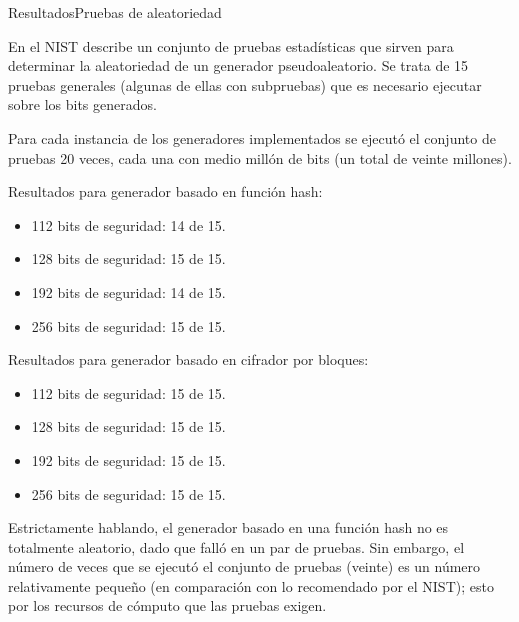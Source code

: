 \begin{frame}{Resultados}{Pruebas de aleatoriedad}

  En \cite{nist_pruebas} el NIST describe un conjunto de pruebas estadísticas
  que sirven para determinar la aleatoriedad de un generador pseudoaleatorio.
  Se trata de 15 pruebas generales (algunas de ellas con subpruebas) que es
  necesario ejecutar sobre los bits generados.

  Para cada instancia de los generadores implementados se ejecutó el conjunto
  de pruebas 20 veces, cada una con medio millón de bits (un total de veinte
  millones).

  {
    Resultados para generador basado en función hash:
    \begin{itemize}
      \item 112 bits de seguridad: 14 de 15.
      \item 128 bits de seguridad: 15 de 15.
      \item 192 bits de seguridad: 14 de 15.
      \item 256 bits de seguridad: 15 de 15.
    \end{itemize}
  }

  {
    Resultados para generador basado en cifrador por bloques:
    \begin{itemize}
      \item 112 bits de seguridad: 15 de 15.
      \item 128 bits de seguridad: 15 de 15.
      \item 192 bits de seguridad: 15 de 15.
      \item 256 bits de seguridad: 15 de 15.
    \end{itemize}
  }

  \note
  {
    Estrictamente hablando, el generador basado en una función hash no es
    totalmente aleatorio, dado que falló en un par de pruebas. Sin embargo,
    el número de veces que se ejecutó el conjunto de pruebas (veinte) es
    un número relativamente pequeño (en comparación con lo recomendado por
    el NIST); esto por los recursos de cómputo que las pruebas exigen. 
  }

\end{frame}
